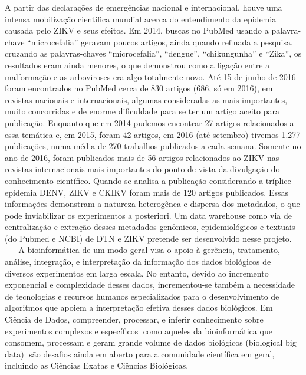 A partir das declarações de emergências nacional e internacional, houve uma intensa mobilização científica mundial acerca do entendimento da epidemia causada pelo ZIKV e seus efeitos. Em 2014, buscas no PubMed  usando a palavra-chave “microcefalia” geravam poucos artigos, ainda quando refinada a pesquisa, cruzando as palavras-chaves “microcefalia”, “dengue”, “chikungunha” e “Zika”, os resultados eram ainda menores, o que demonstrou como a ligação entre a malformação e as arboviroses era algo totalmente novo. Até 15 de junho de 2016 foram encontrados no PubMed cerca de 830 artigos (686, só em 2016), em revistas nacionais e internacionais, algumas consideradas as mais importantes, muito concorridas e de enorme dificuldade para se ter um artigo aceito para publicação. Enquanto que em 2014 pudemos encontrar 27 artigos relacionados a essa temática e, em 2015, foram 42 artigos, em 2016 (até setembro) tivemos 1.277 publicações, numa média de 270 trabalhos publicados a cada semana. Somente no ano de 2016, foram publicados mais de 56 artigos relacionados ao ZIKV nas revistas internacionais mais importantes do ponto de vista da divulgação do conhecimento científico. Quando se analisa a publicação considerando a tríplice epidemia DENV, ZIKV e CKIKV foram mais de 120 artigos publicados. Essas informações demonstram a natureza heterogênea e dispersa dos metadados, o que pode inviabilizar os experimentos a posteriori. Um data warehouse como via de centralização e extração desses metadados genômicos, epidemiológicos e textuais (do Pubmed e NCBI) de DTN e ZIKV pretende ser desenvolvido nesse projeto.
----
A bioinformática de um modo geral visa o apoio à gerência, tratamento, análise, integração, e interpretação da informação dos dados biológicos de diversos experimentos em larga escala. No entanto, devido ao incremento exponencial e complexidade desses dados, incrementou-se também a necessidade de tecnologias e recursos humanos especializados para o desenvolvimento de algoritmos que apoiem a interpretação efetiva desses dados biológicos. Em Ciência de Dados, compreender, processar, e inferir conhecimento sobre experimentos complexos e específicos como aqueles da bioinformática que consomem, processam e geram grande volume de dados biológicos (biological big data) são desafios ainda em aberto para a comunidade científica em geral, incluindo as Ciências Exatas e Ciências Biológicas.
